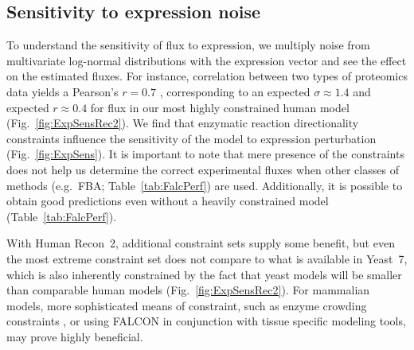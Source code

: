 \subsection{Sensitivity to expression noise}
\label{sec:sensToExpNoise}
To understand the sensitivity of flux to expression, we multiply noise
from multivariate log-normal distributions with the expression vector
and see the effect on the estimated fluxes. For instance, correlation
between two types of proteomics data yields a Pearson's $r = 0.7$
\citep{Gholami2013}, corresponding to an expected $\sigma \approx 1.4$
and expected $r \approx 0.4$ for flux in our most highly constrained
human model (\suppOrApp Fig.~\ref{fig:ExpSensRec2}). We find that
enzymatic reaction directionality constraints influence the
sensitivity of the model to expression perturbation
(Fig.~\ref{fig:ExpSens}). It is important to note that mere presence
of the constraints does not help us determine the correct experimental
fluxes when other classes of methods (e.g.\ FBA;
Table~\ref{tab:FalcPerf}) are used. Additionally, it is possible to
obtain good predictions even without a heavily constrained model
(Table~\ref{tab:FalcPerf}).

With Human Recon~2, additional constraint sets supply some benefit,
but even the most extreme constraint set does not compare to what is
available in Yeast~7, which is also inherently constrained by the fact
that yeast models will be smaller than comparable human models
(\suppOrApp Fig.~\ref{fig:ExpSensRec2}). For mammalian models, more
sophisticated means of constraint, such as enzyme crowding constraints
\citep{Shlomi2011}, or using FALCON in conjunction with tissue
specific modeling tools, may prove highly beneficial.

